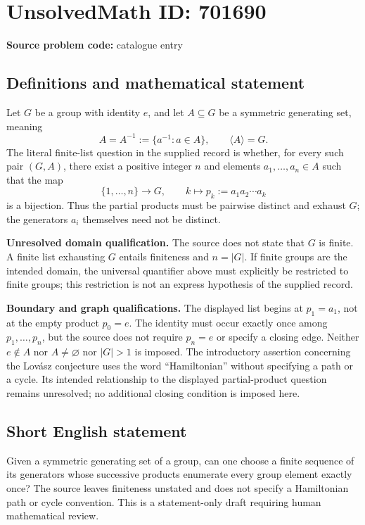 \documentclass[11pt]{article}
\begin{document}
\section*{UnsolvedMath ID: 701690}
\textbf{Source problem code:} catalogue entry
\subsection{Definitions and mathematical statement}
Let \(G\) be a group with identity \(e\), and let \(A\subseteq G\) be a symmetric generating set, meaning
\[
A=A^{-1}:=\{a^{-1}:a\in A\},\qquad \langle A\rangle=G.
\]
The literal finite-list question in the supplied record is whether, for every such pair \((G,A)\), there exist a positive integer \(n\) and elements \(a_1,\ldots,a_n\in A\) such that the map
\[
\{1,\ldots,n\}\longrightarrow G,\qquad
k\longmapsto p_k:=a_1a_2\cdots a_k
\]
is a bijection. Thus the partial products must be pairwise distinct and exhaust \(G\); the generators \(a_i\) themselves need not be distinct.

\textbf{Unresolved domain qualification.} The source does not state that \(G\) is finite. A finite list exhausting \(G\) entails finiteness and \(n=|G|\). If finite groups are the intended domain, the universal quantifier above must explicitly be restricted to finite groups; this restriction is not an express hypothesis of the supplied record.

\textbf{Boundary and graph qualifications.} The displayed list begins at \(p_1=a_1\), not at the empty product \(p_0=e\). The identity must occur exactly once among \(p_1,\ldots,p_n\), but the source does not require \(p_n=e\) or specify a closing edge. Neither \(e\notin A\) nor \(A\ne\varnothing\) nor \(|G|>1\) is imposed. The introductory assertion concerning the Lov\'asz conjecture uses the word ``Hamiltonian'' without specifying a path or a cycle. Its intended relationship to the displayed partial-product question remains unresolved; no additional closing condition is imposed here.
\subsection{Short English statement}
Given a symmetric generating set of a group, can one choose a finite sequence of its generators whose successive products enumerate every group element exactly once? The source leaves finiteness unstated and does not specify a Hamiltonian path or cycle convention. This is a statement-only draft requiring human mathematical review.
\end{document}
